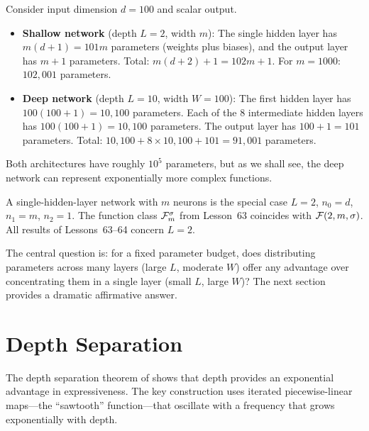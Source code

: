 \documentclass[11pt,a4paper]{article}
\begin{document}
\begin{example}
\label{ex:param-count}
Consider input dimension $d = 100$ and scalar output.
\begin{itemize}[nosep]
  \item \textbf{Shallow network} (depth $L = 2$, width $m$):
    The single hidden layer has $m(d + 1) = 101m$ parameters (weights
    plus biases), and the output layer has $m + 1$ parameters.  Total:
    $m(d+2) + 1 = 102m + 1$.  For $m = 1000$: $102{,}001$ parameters.
  \item \textbf{Deep network} (depth $L = 10$, width $W = 100$):
    The first hidden layer has $100(100 + 1) = 10{,}100$ parameters.
    Each of the 8 intermediate hidden layers has $100(100 + 1) = 10{,}100$
    parameters.  The output layer has $100 + 1 = 101$ parameters.
    Total: $10{,}100 + 8 \times 10{,}100 + 101 = 91{,}001$ parameters.
\end{itemize}
Both architectures have roughly $10^5$ parameters, but as we shall see,
the deep network can represent exponentially more complex functions.
\end{example}

\begin{remark}
\label{rem:single-vs-deep}
A single-hidden-layer network with $m$ neurons is the special case
$L = 2$, $n_0 = d$, $n_1 = m$, $n_2 = 1$.  The function class
$\mathcal{F}_m^{\sigma}$ from Lesson~63 coincides with $\mathcal{F}(2, m,
\sigma)$.  All results of Lessons~63--64 concern $L = 2$.
\end{remark}

The central question is: for a fixed parameter budget, does distributing
parameters across many layers (large $L$, moderate $W$) offer any
advantage over concentrating them in a single layer (small $L$, large
$W$)?  The next section provides a dramatic affirmative answer.

\section{Depth Separation}
\label{sec:depth-separation}

The depth separation theorem of \citet{telgarsky2016} shows that
depth provides an exponential advantage in expressiveness.  The
key construction uses iterated piecewise-linear maps---the ``sawtooth''
function---that oscillate with a frequency that grows exponentially
with depth.
\end{document}
